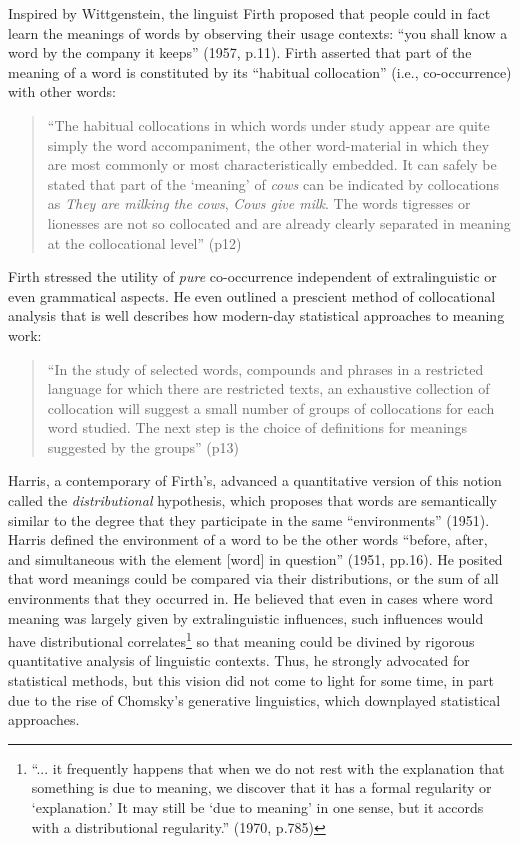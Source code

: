 \documentclass[man,floatsintext]{apa6}
\begin{document}
Inspired by Wittgenstein, the linguist Firth proposed that people could in fact learn the meanings of words by observing their usage contexts: ``you shall know a word by the company it keeps'' (1957, p.11). Firth asserted that part of the meaning of a word is constituted by its ``habitual collocation'' (i.e., co-occurrence) with other words:

\begin{quote}
  ``The habitual collocations in which words under study appear are quite simply the word accompaniment, the other word-material in which they are most commonly or most characteristically embedded. It can safely be stated that part of the `meaning' of \emph{cows} can be indicated by collocations as \emph{They are milking the cows}, \emph{Cows give milk}. The words tigresses or lionesses are not so collocated and are already clearly separated in meaning at the collocational level'' (p12)
\end{quote}

Firth stressed the utility of \emph{pure} co-occurrence independent of extralinguistic or even grammatical aspects. He even outlined a prescient method of collocational analysis that is well describes how modern-day statistical approaches to meaning work:
\begin{quote}
  ``In the study of selected words, compounds and phrases in a restricted language for which there are restricted texts, an exhaustive collection of collocation will suggest a small number of groups of collocations for each word studied. The next step is the choice of definitions for meanings suggested by the groups'' (p13)
\end{quote}

Harris, a contemporary of Firth's, advanced a quantitative version of this notion called the \emph{distributional} hypothesis, which proposes that words are semantically similar to the degree that they participate in the same ``environments'' (1951). Harris defined the environment of a word to be the other words ``before, after, and simultaneous with the element [word] in question'' (1951, pp.16). He posited that word meanings could be compared via their distributions, or the sum of all environments that they occurred in. He believed that even in cases where word meaning was largely given by extralinguistic influences, such influences would have distributional correlates\footnote{``... it frequently happens that when we do not rest with the explanation that something is due to meaning, we discover that it has a formal regularity or `explanation.' It may still be `due to meaning' in one sense, but it accords with a distributional regularity.'' (1970, p.785)} so that meaning could be divined by rigorous quantitative analysis of linguistic contexts. Thus, he strongly advocated for statistical methods, but this vision did not come to light for some time, in part due to the rise of Chomsky's generative linguistics, which downplayed statistical approaches.
\end{document}
